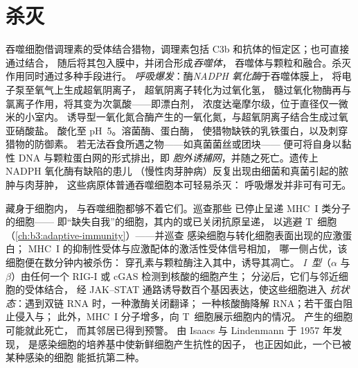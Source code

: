 \section{杀灭}

\begin{definition}[吞噬作用与呼吸爆发]\label{def:b3:innate-immunity:killing}
吞噬细胞借调理素的受体结合猎物，调理素包括 C3b
和抗体的恒定区；也可直接通过结合，
随后将其包入膜中，并闭合形成\emph{吞噬体}，
吞噬体与颗粒和融合。杀灭作用同时通过多种手段进行。
\emph{呼吸爆发}：酶\emph{NADPH 氧化酶}于吞噬体膜上，
将电子泵至氧气上生成超氧阴离子，
超氧阴离子转化为过氧化氢，
髓过氧化物酶再与氯离子作用，将其变为次氯酸——即漂白剂，
浓度达毫摩尔级，位于直径仅一微米的小室内。
诱导型一氧化氮合酶产生的一氧化氮，与超氧阴离子结合生成过氧亚硝酸盐。
酸化至 pH~5。溶菌酶、蛋白酶，
使猎物缺铁的乳铁蛋白，以及刺穿猎物的防御素。
若无法吞食所遇之物——如真菌菌丝或团块——
便可将自身以黏性 DNA 与颗粒蛋白网的形式排出，即\emph{
胞外诱捕网}，并随之死亡。遗传上 NADPH 氧化酶有缺陷的患儿
（慢性肉芽肿病）反复出现由细菌和真菌引起的脓肿与肉芽肿，
这些病原体普通吞噬细胞本可轻易杀灭：
呼吸爆发并非可有可无。
\end{definition}

\begin{definition}[自然杀伤细胞与干扰素]\label{def:b3:innate-immunity:nk-ifn}
藏身于细胞内，
与吞噬细胞都够不着它们。\emph{}巡查那些
已停止呈递 MHC~I 类分子的细胞——
即“缺失自我”的细胞，其内的或已关闭抗原呈递，
以逃避 T~细胞（\cref{ch:b3:adaptive-immunity}）——并巡查
感染细胞与转化细胞表面出现的应激蛋白；
MHC~I 的抑制性受体与应激配体的激活性受体信号相加，
哪一侧占优，该细胞便在数分钟内被杀伤：
穿孔素与颗粒酶注入其中，诱导其凋亡。
\emph{I~型}（$\alpha$ 与 $\beta$）由任何一个 RIG-I 或 cGAS 检测到核酸的细胞产生；
分泌后，它们与邻近细胞的受体结合，
经 JAK--STAT 通路诱导数百个基因表达，使这些细胞进入
\emph{抗状态}：遇到双链 RNA 时，一种激酶关闭翻译；
一种核酸酶降解 RNA；若干蛋白阻止侵入与；
此外，MHC~I 分子增多，向 T~细胞展示细胞内的情况。
产生的细胞可能就此死亡，
而其邻居已得到预警。
由 Isaacs 与 Lindenmann 于 1957 年发现，
是感染细胞的培养基中使新鲜细胞产生抗性的因子，
也正因如此，一个已被某种感染的细胞
能抵抗第二种。
\end{definition}

